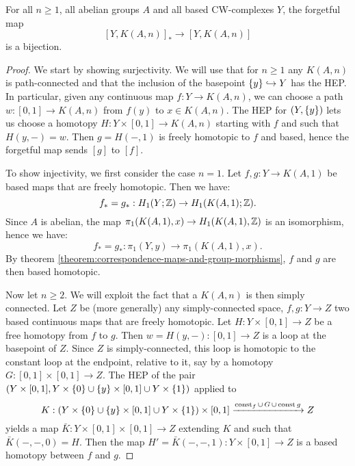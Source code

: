 \begin{lemma}
For all $n\ge1$, all abelian groups $A$ and all based CW-complexes $Y$, the forgetful map
\[[Y,K(A,n)]_*\to [Y,K(A,n)]\]
is a bijection.
\end{lemma}

\begin{proof}
We start by showing surjectivity. We will use that for $n\ge1$ any $K(A,n)$ is path-connected and that the inclusion of the basepoint $\{y\}\hookrightarrow Y$ has the HEP. In particular, given any continuous map $f:Y\to K(A,n)$, we can choose a path $w:[0,1]\to K(A,n)$ from $f(y)$ to $x\in K(A,n)$. The HEP for $(Y,\{y\})$ lets us choose a homotopy $H:Y\times[0,1]\to K(A,n)$ starting with $f$ and such that $H(y,-)=w$. Then $g=H(-,1)$ is freely homotopic to $f$ and based, hence the forgetful map sends $[g]$ to $[f]$.

To show injectivity, we first consider the case $n=1$. Let $f,g:Y\to K(A,1)$ be based maps that are freely homotopic. Then we have:
\[f_*=g_*:H_1(Y;{\mathbb Z})\to H_1(K(A,1);{\mathbb Z}).\]
Since $A$ is abelian, the map $\pi_1(K(A,1),x)\to H_1(K(A,1),{\mathbb Z})$ is an isomorphism, hence we have:
\[f_*=g_*:\pi_1(Y,y)\to \pi_1(K(A,1),x).\]
By theorem \ref{theorem:correspondence-maps-and-group-morphisms}, $f$ and $g$ are then based homotopic.

Now let $n\ge2$. We will exploit the fact that a $K(A,n)$ is then simply connected. Let $Z$ be (more generally) any simply-connected space, $f,g:Y\to Z$ two based continuous maps that are freely homotopic. Let $H:Y\times[0,1]\to Z$ be a free homotopy from $f$ to $g$. Then $w=H(y,-):[0,1]\to Z$ is a loop at the basepoint of $Z$. Since $Z$ is simply-connected, this loop is homotopic to the constant loop at the endpoint, relative to it, say by a homotopy $G:[0,1]\times[0,1]\to Z$. The HEP of the pair $(Y\times[0,1],Y\times\{0\}\cup\{y\}\times[0,1]\cup Y\times\{1\})$ applied to
\[K:(Y\times\{0\}\cup\{y\}\times[0,1]\cup Y\times\{1\})\times[0,1]\xrightarrow{\operatorname{const}_f\cup\,G\,\cup\, \operatorname{const} g} Z\]
yields a map $\bar K:Y\times[0,1]\times[0,1]\to Z$ extending $K$ and such that $\bar K(-,-,0)=H$. Then the map $H'=\bar K(-,-,1):Y\times[0,1]\to Z$ is a based homotopy between $f$ and $g$.
\end{proof}

